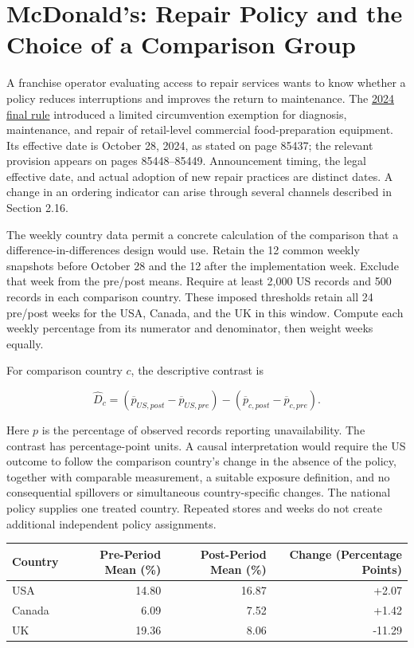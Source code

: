 \hypertarget{M06-mcdonalds-repair-policy-and-the-choice-of-a-comparison-group}{%
\section{McDonald's: Repair Policy and the Choice of a Comparison
Group}\label{M06-mcdonalds-repair-policy-and-the-choice-of-a-comparison-group}}

\noindent \noindent A franchise operator evaluating access to repair services
wants to know whether a policy reduces interruptions and improves the
return to maintenance. The
\href{https://www.govinfo.gov/content/pkg/FR-2024-10-28/pdf/2024-24563.pdf}{2024
final rule} introduced a limited circumvention exemption for diagnosis,
maintenance, and repair of retail-level commercial food-preparation
equipment. Its effective date is October 28, 2024, as stated on page
85437; the relevant provision appears on pages 85448--85449.
Announcement timing, the legal effective date, and actual adoption of
new repair practices are distinct dates. A change in an ordering
indicator can arise through several channels described in Section 2.16.

The weekly country data permit a concrete calculation of the comparison
that a difference-in-differences design would use. Retain the 12 common
weekly snapshots before October 28 and the 12 after the implementation
week. Exclude that week from the pre/post means. Require at least 2,000
US records and 500 records in each comparison country. These imposed
thresholds retain all 24 pre/post weeks for the USA, Canada, and the UK
in this window. Compute each weekly percentage from its numerator and
denominator, then weight weeks equally.

For comparison country \(c\), the descriptive contrast is

\[
\widehat D_c=(\overline p_{US,post}-\overline p_{US,pre})
 -(\overline p_{c,post}-\overline p_{c,pre}).
\]

Here \(p\) is the percentage of observed records reporting
unavailability. The contrast has percentage-point units. A causal
interpretation would require the US outcome to follow the comparison
country's change in the absence of the policy, together with comparable
measurement, a suitable exposure definition, and no consequential
spillovers or simultaneous country-specific changes. The national policy
supplies one treated country. Repeated stores and weeks do not create
additional independent policy assignments.

\begin{table}[H]
\centering\small
\begin{tabular}{@{}lrrr@{}}
\toprule
Country & Pre-Period Mean (\%) & Post-Period Mean (\%) & Change
(Percentage Points) \\
\midrule

USA & 14.80 & 16.87 & +2.07 \\
Canada & 6.09 & 7.52 & +1.42 \\
UK & 19.36 & 8.06 & -11.29 \\
\bottomrule
\end{tabular}
\end{table}

